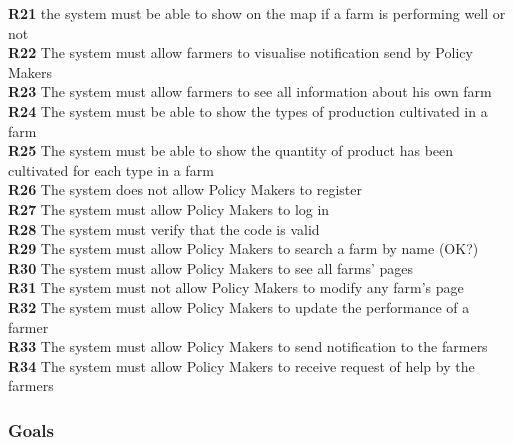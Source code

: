 \textbf{R21} the system must be able to show on the map if a farm is performing well or not \\
\textbf{R22} The system must allow farmers to visualise notification send by Policy Makers\\
\textbf{R23} The system must allow farmers to see all information about his own farm\\
\textbf{R24} The system must be able to show the types of production cultivated in a farm\\
\textbf{R25} The system must be able to show the quantity of product has been cultivated for each type in a farm\\
\textbf{R26} The system does not allow Policy Makers to register\\
\textbf{R27} The system must allow Policy Makers to log in\\
\textbf{R28} The system must verify that the code is valid\\
\textbf{R29} The system must allow Policy Makers to search a farm by name (OK?)\\
\textbf{R30} The system must allow Policy Makers to see all farms’ pages\\
\textbf{R31} The system must not allow Policy Makers to modify any farm’s page\\
\textbf{R32} The system must allow Policy Makers to update the performance of a farmer\\
\textbf{R33} The system must allow Policy Makers to send notification to the farmers\\
\textbf{R34} The system must allow Policy Makers to receive request of help by the farmers\\
\newpage

\subsubsection{Goals}

